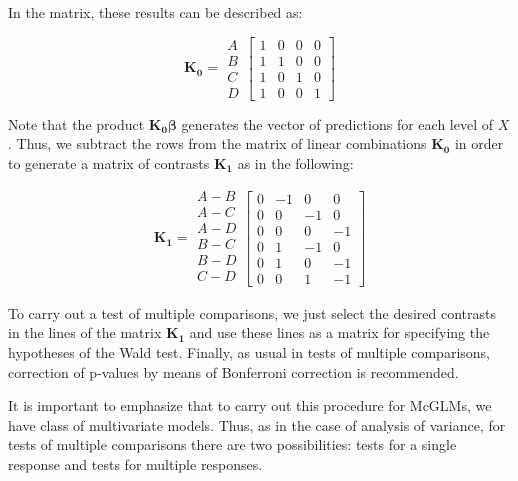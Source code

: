 \documentclass[article]{jss}\usepackage[]{graphicx}\usepackage[]{xcolor}
\begin{document}
In the matrix, these results can be described as:

$$
    \boldsymbol{K_0} = 
      \begin{matrix}
        A\\ 
        B\\ 
        C\\ 
        D 
      \end{matrix} 
    \begin{bmatrix}
      1 & 0 & 0 & 0\\ 
      1 & 1 & 0 & 0\\ 
      1 & 0 & 1 & 0\\ 
      1 & 0 & 0 & 1 
    \end{bmatrix}
$$

Note that the product $\boldsymbol{K_0} \boldsymbol{\beta}$ generates the vector of predictions for each level of $X$. Thus, we subtract the rows from the matrix of linear combinations $\boldsymbol{K_0}$ in order to generate a matrix of contrasts $\boldsymbol{K_1}$ as in the following:

$$
    \boldsymbol{K_1} = 
      \begin{matrix}
        A-B\\ 
        A-C\\ 
        A-D\\ 
        B-C\\
        B-D\\
        C-D\\ 
      \end{matrix} 
    \begin{bmatrix}
      0 & -1 &  0 &  0\\ 
      0 &  0 & -1 &  0\\ 
      0 &  0 &  0 & -1\\ 
      0 &  1 & -1 &  0\\ 
      0 &  1 &  0 & -1\\ 
      0 &  0 &  1 & -1 
    \end{bmatrix}
$$

To carry out a test of multiple comparisons, we just select the desired contrasts in the lines of the matrix $\boldsymbol{K_1}$ and use these lines as a matrix for specifying the hypotheses of the Wald test. Finally, as usual in tests of multiple comparisons, correction of p-values by means of Bonferroni correction is recommended.

It is important to emphasize that to carry out this procedure for McGLMs, we have class of multivariate models. Thus, as in the case of analysis of variance, for tests of multiple comparisons there are two possibilities: tests for a single response and tests for multiple responses.
\end{document}
